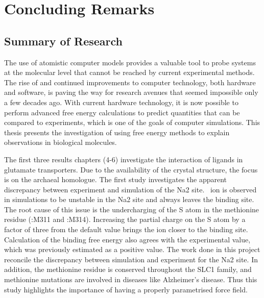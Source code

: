 \chapter{Concluding Remarks}
\label{chap:conc}

\section{Summary of Research}
The use of atomistic computer models provides a valuable tool to probe systems at the 
molecular level that cannot be reached by current experimental methods. The rise of and 
continued improvements to computer technology, both hardware and software, is paving the 
way for research avenues that seemed impossible only a few decades ago. With current 
hardware technology, it is now possible to perform advanced free energy calculations to 
predict quantities that can be compared to experiments, which is one of the goals of 
computer simulations. This thesis presents the investigation of using free energy methods 
to explain observations in biological molecules.

The first three results chapters (4-6) investigate the interaction of ligands in glutamate 
transporters. Due to the availability of the crystal structure, the focus is on the archaeal 
homologue. The first study investigates the apparent discrepancy between experiment and 
simulation of the Na2 site. \Na\ ion is observed in simulations to be unstable in the Na2 
site and always leaves the binding site. The root cause of this issue is the undercharging 
of the S atom in the methionine residue (\GltPh:M311 and \GltTk:M314). Increasing the 
partial charge on the S atom by a factor of three from the default value brings the ion 
closer to the binding site. Calculation of the binding free energy also agrees with the 
experimental value, which was previously estimated as a positive value. The work done in 
this project reconcile the discrepancy between simulation and experiment for the Na2 site. 
In addition, the methionine residue is conserved throughout the SLC1 family, and methionine 
mutations are involved in diseases like Alzheimer's disease. Thus this study highlights the 
importance of having a properly parametrised force field.

